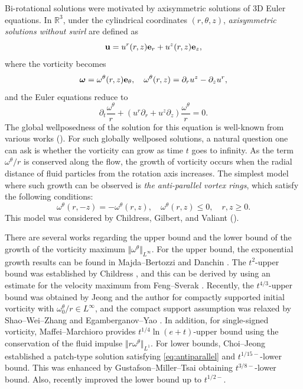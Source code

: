 \documentclass[11pt]{amsart}
\theoremstyle{definition}
\theoremstyle{remark}
\numberwithin{equation}{section}
\numberwithin{equation}{section}
\newcommand{\nrm}[1]{\Vert#1\Vert}
\newcommand{\rd}{\partial}
\newcommand{\0}{\emptyset}
\newcommand{\ift}{\infty}
\newcommand{\tht}{\theta}
\newcommand{\omg}{\omega}
\newcommand{\bfe}{{\bf e}}
\newcommand{\bfu}{{\bf u}}
\newcommand{\bbR}{\mathbb R}
\begin{document}
	Bi-rotational solutions were motivated by axisymmetric solutions of 3D Euler equations. In $\bbR^{3}$, under the cylindrical coordinates $(r,\tht,z)$, \textit{axisymmetric solutions without swirl} are defined as
	\begin{equation}
		\bfu=u^{r}(r,z)\bfe_{r}+u^{z}(r,z)\bfe_{z},
	\end{equation}
	where the vorticity becomes
	\begin{equation}
		\boldsymbol{\omg}=\omg^{\tht}(r,z)\bfe_{\tht},\quad \omg^{\tht}(r,z)=\rd_{r}u^{z}-\rd_{z}u^{r},
	\end{equation}
	and the Euler equations reduce to
	\begin{equation}
		\rd_{t}\frac{\omg^{\tht}}{r}+(u^{r}\rd_{r}+u^{z}\rd_{z})\frac{\omg^{\tht}}{r}=0.
	\end{equation}
	The global wellposedness of the solution for this equation is well-known from various works (\cite{UY1968, Raymond, SY, Danaxi, AHK}). For such globally wellposed solutions, a natural question one can ask is whether the vorticity can grow as time $t$ goes to infinity. As the term $\omg^{\tht}/r$ is conserved along the flow, the growth of vorticity occurs when the radial distance of fluid particles from the rotation axis increases. The simplest model where such growth can be observed is \textit{the anti-parallel vortex rings}, which satisfy the following conditions:
	\begin{equation}\label{eq:antiparallel}
		\omg^{\tht}(r,-z)=-\omg^{\tht}(r,z),\quad \omg^{\tht}(r,z)\leq 0,\quad r,z\geq0.
	\end{equation}
	This model was considered by Childress, Gilbert, and Valiant (\cite{Child07, Child08, ChilGil1}).
	
	There are several works regarding the upper bound and the lower bound of the growth of the vorticity maximum $\nrm{\omg^{\tht}}_{L^{\ift}}$. For the upper bound, the exponential growth results can be found in Majda--Bertozzi \cite{Majda2002} and Danchin \cite{Danaxi}. The $t^{2}$-upper bound was established by Childress \cite{Child07}, and this can be derived by using an estimate for the velocity maximum from Feng--Sverak \cite{FeSv}. Recently, the $t^{4/3}$-upper bound was obtained by Jeong and the author \cite{LJ_optimal} for compactly supported initial vorticity with $\omg_{0}^{\tht}/r\in L^{\ift}$, and the compact support assumption was relaxed by Shao--Wei--Zhang \cite{SWZ25} and Egamberganov--Yao \cite{EYao25}. In addition, for single-signed vorticity, Maffei--Marchioro \cite{Maffei2001} provides $t^{1/4}\ln(e+t)$-upper bound using the conservation of the fluid impulse $\nrm{r\omg^{\tht}}_{L^{1}}$. For lower bounds, Choi--Jeong established a patch-type solution satisfying \eqref{eq:antiparallel} and $t^{1/15-}$-lower bound. This was enhanced by Gustafson--Miller--Tsai \cite{GMT2023} obtaining $t^{3/8-}$-lower bound. Also, \cite{EYao25} recently improved the lower bound up to $ t^{1/2-} $.
	
\end{document}

